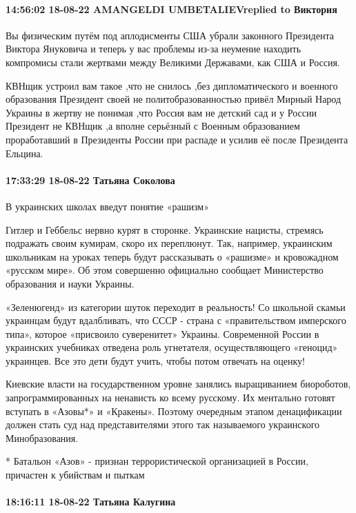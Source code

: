 \paragraph{14:56:02 18-08-22 AMANGELDI UMBETALIEVreplied to Виктория}

Вы физическим путём под аплодисменты США убрали законного Президента Виктора
Януковича и теперь у вас проблемы из-за неумение находить компромисы стали
жертвами между Великими Державами, как США и Россия.

КВНщик устроил вам такое ,что не снилось ,без дипломатического и военного
образования Президент своей не политобразованностью привёл Мирный Народ Украины
в жертву не понимая ,что Россия вам не детский сад и у России Президент не
КВНщик ,а вполне серьёзный с Военным образованием проработавший в Президенты
России при распаде и усилив её после Президента Ельцина.

\paragraph{17:33:29 18-08-22 Татьяна Соколова}

В украинских школах введут понятие «рашизм»

Гитлер и Геббельс нервно курят в сторонке. Украинские нацисты, стремясь
подражать своим кумирам, скоро их переплюнут. Так, например, украинским
школьникам на уроках теперь будут рассказывать о «рашизме» и кровожадном
«русском мире». Об этом совершенно официально сообщает Министерство образования
и науки Украины.

«Зеленюгенд» из категории шуток переходит в реальность! Со школьной скамьи
украинцам будут вдалбливать, что СССР - страна с «правительством имперского
типа», которое «присвоило суверенитет» Украины. Современной России в украинских
учебниках отведена роль угнетателя, осуществляющего «геноцид» украинцев. Все
это дети будут учить, чтобы потом отвечать на оценку!

Киевские власти на государственном уровне занялись выращиванием биороботов,
запрограммированных на ненависть ко всему русскому. Их ментально готовят
вступать в «Азовы*» и «Кракены». Поэтому очередным этапом денацификации должен
стать суд над представителями этого так называемого украинского Минобразования.

* Батальон «Азов» - признан террористической организацией в России, причастен к
убийствам и пыткам

\paragraph{18:16:11 18-08-22 Татьяна Калугина}

